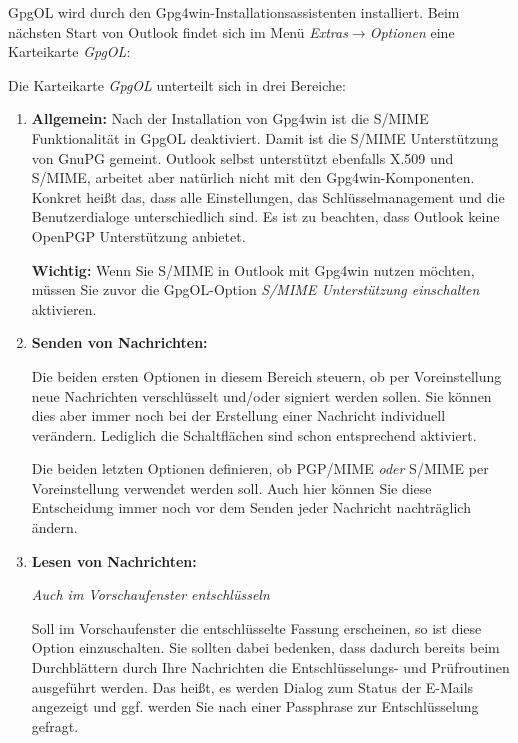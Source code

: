 \documentclass[a4paper,11pt, oneside,openright,titlepage,dvips]{scrbook}
\newcommand{\Menu}[1]{\emph{#1}}
\newcommand{\Email}{E-Mail}
\newcommand\margin[1]{\marginline {\sffamily\scriptsize #1}}
\newcommand{\IncludeImage}[2][]{\texorhtml{%
\texttt{[image: \#2]}%
}{%
\htmlimg{#2.png}%
}}
\begin{document}
GpgOL wird durch den Gpg4win-Installationsassistenten installiert.  Beim nächsten
Start von Outlook findet sich im Menü
\Menu{Extras$\rightarrow$Optionen} eine Karteikarte \Menu{GpgOL}:

\begin{center}
\IncludeImage[width=0.45\textwidth]{sc-gpgol-options_de}
\end{center}

\clearpage
Die Karteikarte \textit{GpgOL} unterteilt sich in drei Bereiche:
\begin{enumerate}
    \item \textbf{Allgemein:}
        Nach der Installation von Gpg4win ist die 
        \T\margin{\IncludeImage[width=1.5cm]{smime-icon}}
        S/MIME Funktionalität in GpgOL deaktiviert.
        Damit ist die S/MIME Unterstützung von GnuPG gemeint.
        Outlook selbst unterstützt ebenfalls X.509 und S/MIME,
        arbeitet aber natürlich nicht mit den Gpg4win-Komponenten.
        Konkret heißt das, dass alle Einstellungen,
        das Schlüsselmanagement und die Benutzerdialoge unterschiedlich
        sind. Es ist zu beachten, dass Outlook keine OpenPGP
        Unterstützung anbietet.

        \textbf{Wichtig:} Wenn Sie S/MIME in Outlook mit Gpg4win nutzen
        möchten, müssen Sie zuvor die GpgOL-Option
        \textit{S/MIME Unterstützung einschalten} aktivieren.

    \item \textbf{Senden von Nachrichten:}

        Die beiden ersten Optionen in diesem Bereich steuern, ob per
        Voreinstellung neue Nachrichten verschlüsselt und/oder signiert
        werden sollen. Sie können dies aber immer noch bei der
        Erstellung einer Nachricht individuell verändern. Lediglich
        die Schaltflächen sind schon entsprechend aktiviert.

        Die beiden letzten Optionen definieren, ob PGP/MIME
        \textit{oder} S/MIME per Voreinstellung verwendet werden soll.
        Auch hier können Sie diese Entscheidung immer noch vor dem
        Senden jeder Nachricht nachträglich ändern.

    \item \textbf{Lesen von Nachrichten:}

        \textit{Auch im Vorschaufenster entschlüsseln}

        Soll im Vorschaufenster die entschlüsselte Fassung erscheinen,
        so ist diese Option einzuschalten.
        Sie sollten dabei bedenken, dass dadurch bereits beim Durchblättern
        durch Ihre Nachrichten die Entschlüsselungs- und Prüfroutinen ausgeführt
        werden. Das heißt, es werden Dialog zum Status der \Email{}s angezeigt
        und ggf. werden Sie nach einer Passphrase zur Entschlüsselung gefragt.


\end{enumerate}
\end{document}
